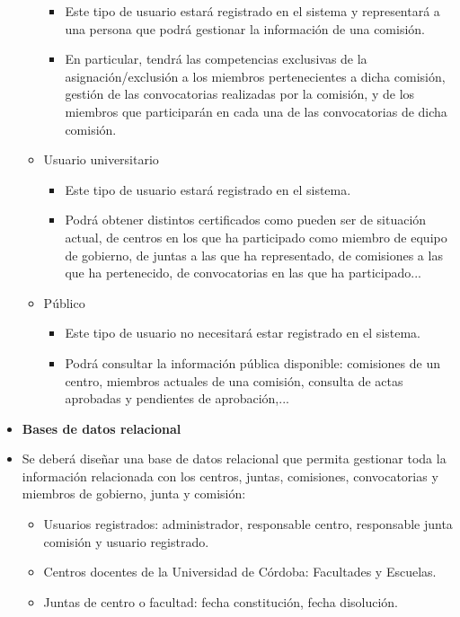 \begin{itemize}
\begin{itemize}
\begin{itemize}
               \item Este tipo de usuario estará registrado en el sistema y representará a una persona que podrá gestionar la información de una comisión.
               \item En particular, tendrá las competencias exclusivas de la asignación/exclusión a los miembros pertenecientes a dicha comisión, gestión de las convocatorias realizadas por la comisión, y de los miembros que participarán en cada una de las convocatorias de dicha comisión.
            \end{itemize}
        \item Usuario universitario
            \begin{itemize}
                \item Este tipo de usuario estará registrado en el sistema.
                \item Podrá obtener distintos certificados como pueden ser de situación actual, de centros en los que ha participado como miembro de equipo de gobierno, de juntas a las que ha representado, de comisiones a las que ha pertenecido, de convocatorias en las que ha participado...
              \end{itemize}
        \item Público
        \begin{itemize}
              \item Este tipo de usuario no necesitará estar registrado en el sistema.
              \item Podrá consultar la información pública disponible: comisiones de un centro, miembros actuales de una comisión, consulta de actas aprobadas y pendientes de aprobación,...
          \end{itemize}
     \end{itemize}
    \item \textbf{Bases de datos relacional}
     \item[] Se deberá diseñar una base de datos relacional que permita gestionar toda la información relacionada con los centros, juntas, comisiones, convocatorias y miembros de gobierno, junta y comisión:
      \begin{itemize}
            \item Usuarios registrados: administrador, responsable centro, responsable junta comisión y usuario registrado.
            \item Centros docentes de la Universidad de Córdoba: Facultades y Escuelas.
            \item Juntas de centro o facultad: fecha constitución, fecha disolución.

\end{itemize}
\end{itemize}
